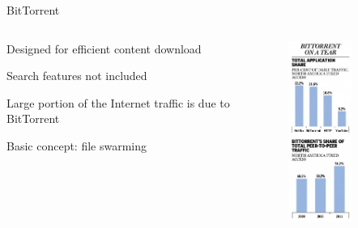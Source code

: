 \begin{frame}{BitTorrent}

\begin{columns}
\begin{column}{0.65\textwidth}

\BI
\item Designed for efficient content download 
\item Search features not included 
\item Large portion of the Internet traffic is due to BitTorrent
\item Basic concept: file swarming
\EI	
	
\begin{Bib}
{\scriptsize
{}
}
\end{Bib}	
\end{column}
\hfill
\begin{column}{0.3\textwidth}
	\includegraphics[width=0.5\textwidth]{p2p-stats1.jpg}

\end{column}
\end{columns}
\end{frame}
